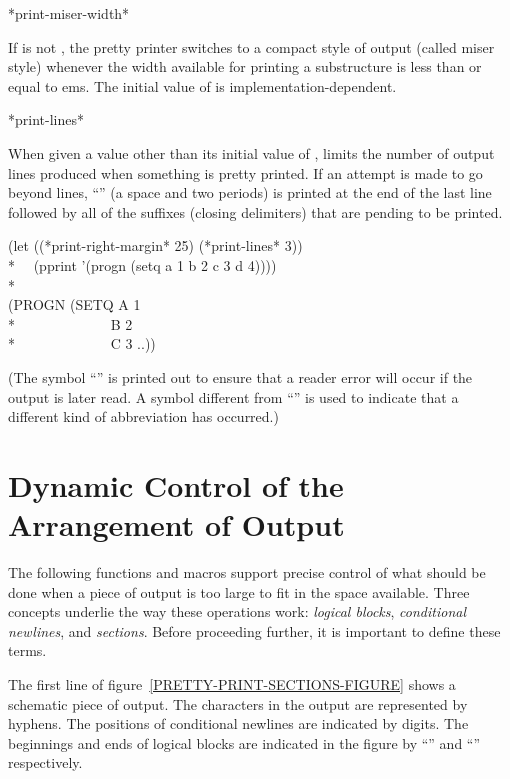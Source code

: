 \begin{defun}[Variable]
*print-miser-width*

If  is not , the pretty printer switches to a compact
style of output (called miser style) whenever the width available for
printing a substructure is less than or equal to  ems.
The initial value of  is implementation-dependent.
\end{defun}

\begin{defun}[Variable]
*print-lines*

When given a value other than its initial value of ,
 limits the number of output lines produced when
something is pretty printed.  If an attempt is made to go beyond
 lines, ``'' (a space and two periods)
is printed at the end of the last
line followed by all of the suffixes (closing delimiters) that are pending
to be printed.
\begin{lisp}
(let ((*print-right-margin* 25) (*print-lines* 3)) \\*
~~(pprint '(progn (setq a 1 b 2 c 3 d 4)))) \\*
\\
(PROGN (SETQ A 1 \\*
~~~~~~~~~~~~~B 2 \\*
~~~~~~~~~~~~~C 3 ..))
\end{lisp}

(The symbol ``'' is printed out to ensure that a reader error will
occur if the output is later read.  A symbol different from ``'' is
used to indicate that a different kind of abbreviation has occurred.)
\end{defun}



\section{Dynamic Control of the Arrangement of Output}

The following functions and macros support precise control of what should
be done when a piece of output is too large to fit in the space available.
Three concepts underlie the way these operations work: \emph{logical blocks},
\emph{conditional newlines}, and \emph{sections}.  Before proceeding further, it is
important to define these terms.

The first line of figure~\ref{PRETTY-PRINT-SECTIONS-FIGURE} shows a
schematic piece of output.  The characters in the output are represented by
hyphens.  The positions of conditional newlines are indicated by
digits.  The beginnings and ends of logical blocks are indicated in the
figure by ``\cdf{<}'' and ``\cdf{>}'' respectively.

